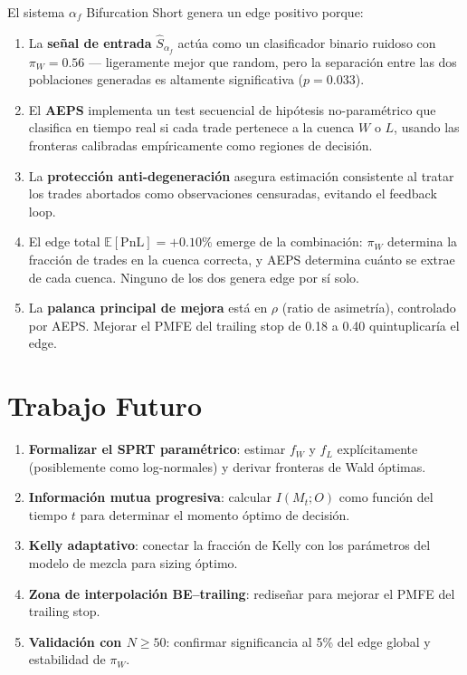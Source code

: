 \documentclass[11pt,a4paper]{article}
\newcommand{\af}{\alpha_f}
\newcommand{\score}{\hat{S}_{\alpha_f}}
\newcommand{\E}{\mathbb{E}}
\begin{document}
\begin{tcolorbox}[keybox, title=Teorema Central (Informal)]
El sistema $\af$ Bifurcation Short genera un edge positivo porque:
\begin{enumerate}[leftmargin=1.5em]
\item La \textbf{se\~nal de entrada} $\score$ act\'ua como un
  clasificador binario ruidoso con $\pi_W = 0.56$ --- ligeramente
  mejor que random, pero la separaci\'on entre las dos poblaciones
  generadas es altamente significativa ($p = 0.033$).

\item El \textbf{AEPS} implementa un test secuencial de hip\'otesis
  no-param\'etrico que clasifica en tiempo real si cada trade
  pertenece a la cuenca $W$ o $L$, usando las fronteras
  calibradas emp\'iricamente como regiones de decisi\'on.

\item La \textbf{protecci\'on anti-degeneraci\'on} asegura estimaci\'on
  consistente al tratar los trades abortados como observaciones
  censuradas, evitando el feedback loop.

\item El edge total $\E[\text{PnL}] = +0.10\%$ emerge de la
  combinaci\'on: $\pi_W$ determina la fracci\'on de trades en
  la cuenca correcta, y AEPS determina cu\'anto se extrae de
  cada cuenca. Ninguno de los dos genera edge por s\'i solo.

\item La \textbf{palanca principal de mejora} est\'a en $\rho$
  (ratio de asimetr\'ia), controlado por AEPS. Mejorar el PMFE
  del trailing stop de 0.18 a 0.40 quintuplicar\'ia el edge.
\end{enumerate}
\end{tcolorbox}


\section{Trabajo Futuro}
\label{sec:future}

\begin{enumerate}[leftmargin=2em]
\item \textbf{Formalizar el SPRT param\'etrico}: estimar $f_W$ y $f_L$
  expl\'icitamente (posiblemente como log-normales) y derivar
  fronteras de Wald \'optimas.
\item \textbf{Informaci\'on mutua progresiva}: calcular $I(M_t; O)$
  como funci\'on del tiempo $t$ para determinar el momento \'optimo
  de decisi\'on.
\item \textbf{Kelly adaptativo}: conectar la fracci\'on de Kelly
  con los par\'ametros del modelo de mezcla para sizing \'optimo.
\item \textbf{Zona de interpolaci\'on BE--trailing}: redise\~nar para
  mejorar el PMFE del trailing stop.
\item \textbf{Validaci\'on con $N \geq 50$}: confirmar significancia
  al 5\% del edge global y estabilidad de $\pi_W$.
\end{enumerate}
\end{document}
